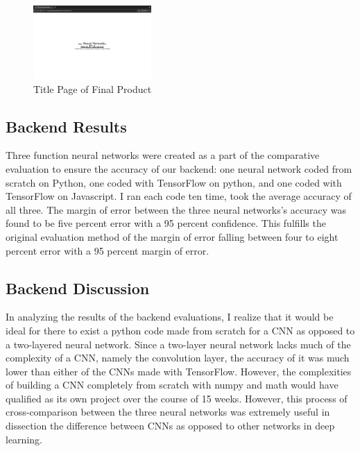 \documentclass[10pt,twocolumn]{article}
\begin{document}
\begin{figure}[h]
\caption{Title Page of Final Product}
\centering
\includegraphics[width=0.4\textwidth]{./Images/titlePage.png}
\end{figure}

\subsection{Backend Results}
Three function neural networks were created as a part of the comparative evaluation to ensure the accuracy of our backend: one neural network coded from scratch on Python, one coded with TensorFlow on python, and one coded with TensorFlow on Javascript. I ran each code ten time, took the average accuracy of all three. The margin of error between the three neural networks's accuracy was found to be five percent error with a 95 percent confidence. This fulfills the original evaluation method of the margin of error falling between four to eight percent error with a 95 percent margin of error. 

\subsection{Backend Discussion}
In analyzing the results of the backend evaluations, I realize that it would be ideal for there to exist a python code made from scratch for a CNN as opposed to a two-layered neural network. Since a two-layer neural network lacks much of the complexity of a CNN, namely the convolution layer, the accuracy of it was much lower than either of the CNNs made with TensorFlow. However, the complexities of building a CNN completely from scratch with numpy and math would have qualified as its own project over the course of 15 weeks. However, this process of cross-comparison between the three neural networks was extremely useful in dissection the difference between CNNs as opposed to other networks in deep learning. 
\end{document}

